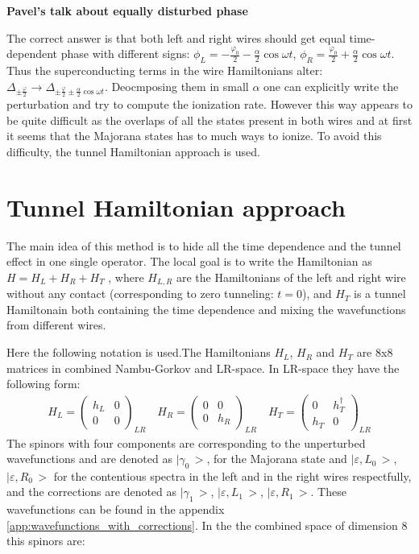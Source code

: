 \textbf{Pavel's talk about equally disturbed phase}

The correct answer is that both left and right wires should get equal time-dependent phase with different signs: $ \phi_L=-\frac{\varphi_0}{2}-\frac{\alpha}{2}\cos \omega t $, $ \phi_R=\frac{\varphi_0}{2}+\frac{\alpha}{2}\cos \omega t $. Thus the superconducting terms in the wire Hamiltonians alter: $ \Delta_{\pm\frac{\varphi}{2}} \to\Delta_{\pm\frac{\varphi}{2}\pm \frac{\alpha}{2}\cos \omega t} $. Deocmposing them in small $ \alpha $ one can explicitly write the perturbation and try to compute the ionization rate. However this way appears to be quite difficult as the overlaps of all the states 
present in both wires and at first it seems that the Majorana states has to much ways to ionize. To avoid this difficulty, the tunnel Hamiltonian approach is used.
\section{Tunnel Hamiltonian approach}
\label{sec:tunnel_hamiltonian}
The main idea of this method is to hide all the time dependence and the tunnel effect in one single operator. The local goal is to write the Hamiltonian as $ H=H_L+H_R+H_T $ , where $ H_{L,R} $ are the Hamiltonians of the left and right wire without any contact (corresponding to zero tunneling: $ t=0 $), and $H_T  $ is a tunnel Hamiltonain both containing the time dependence and mixing the wavefunctions from different wires. 

Here the following notation is used.The Hamiltonians $ H_L $, $ H_R $ and $ H_T $ are 8x8 matrices in combined Nambu-Gorkov and LR-space. In LR-space they have the following form:
\begin{gather}
	H_L
	=
	\begin{pmatrix}
	h_L & 0 \\
	0 & 0
	\end{pmatrix}_{LR}
	\quad
	H_R
=
\begin{pmatrix}
0 & 0 \\
0 & h_R
\end{pmatrix}_{LR}
\quad
	H_T
=
\begin{pmatrix}
0 & h_T^\dagger \\
h_T & 0
\end{pmatrix}_{LR}	
\end{gather}
 The spinors with four components are corresponding to the unperturbed wavefunctions and are denoted as $ \big|\gamma_{0}\,\big> $,  for the Majorana state and $ \big|\varepsilon,L_{0}\,\big> $, $ \big|\varepsilon,R_{0}\,\big> $ for the contentious spectra in the left and in the right wires respectfully, and the corrections are denoted as $ \big|\gamma_{1}\,\big> $, $ \big|\varepsilon,L_{1}\,\big> $, $ \big|\varepsilon,R_{1}\,\big> $. These wavefunctions can be found in the appendix \ref{app:wavefunctions_with_corrections}.  In the the combined space of dimension 8 this spinors are:

